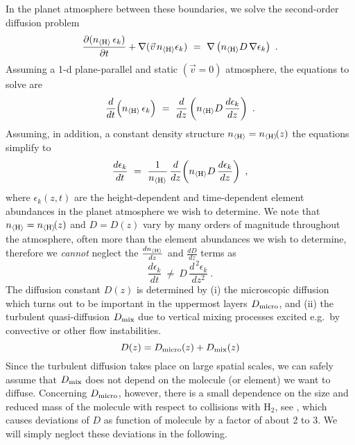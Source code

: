 \documentclass[11pt]{article}
\def\nH{n_{\langle\rm H\rangle}}
\def\ek{\epsilon_k}
\def\pdiff#1#2{\frac{\partial #1}{\partial #2}}
\begin{document}
In the planet atmosphere between these boundaries, we solve the 
second-order diffusion problem
\begin{equation}
  \pdiff{(\nH\,\ek)}{t} + \nabla(\vec{v}\,\nH\ek) 
   ~=~ \nabla\left(\nH D\,\nabla\ek\right) \ .
\end{equation}
Assuming a 1-d plane-parallel and static $(\vec{v}=0)$ atmosphere, the
equations to solve are
\begin{equation}
  \frac{d}{dt}\Big(\nH\,\ek\Big) 
  ~=~ \frac{d}{dz}\left(\nH D\,\frac{d\ek}{dz}\right) \ .
  \label{eq:diff1}
\end{equation}
Assuming, in addition, a constant density structure
$\nH=\nH\!(z)$ the equations simplify to
\begin{equation}
  \frac{d\ek}{dt} 
  ~=~ \frac{1}{\nH}\,\frac{d}{dz}\!\left(\nH D\,\frac{d\ek}{dz}\right) \ ,
  \label{eq:diff2}
\end{equation}
where $\ek(z,t)$ are the height-dependent and time-dependent element
abundances in the planet atmosphere we wish to determine. We note that
$\nH=\nH\!(z)$ and $D=D(z)$ vary by many orders of magnitude
throughout the atmosphere, often more than the element abundances we
wish to determine, therefore we {\sl cannot} neglect the
$\frac{d\nH}{dz}$ and $\frac{dD}{dz}$ terms as
\begin{equation}
  \frac{d\ek}{dt} ~\neq~ D\,\frac{d^{\,2}\ek}{dz^2} \ .
\end{equation}
The diffusion constant $D(z)$ is determined by (i) the microscopic diffusion
which turns out to be important in the uppermost layers $D_{\rm
  micro}$, and (ii) the turbulent quasi-diffusion $D_{\rm mix}$ due to 
vertical mixing processes excited e.g.\ by convective or other flow 
instabilities. 
\begin{equation}
  D(z) = D_{\rm micro}(z) + D_{\rm mix}(z)
\end{equation}
Since the turbulent diffusion takes place on large spatial scales, we
can safely assume that $D_{\rm mix}$ does not depend on the molecule
(or element) we want to diffuse. Concerning $D_{\rm micro}$, however, 
there is a small dependence on the size and reduced mass of the
molecule with respect to collisions with H$_2$, see
\citet[][Eq.~(26) therein]{Woitke2003}, which causes deviations
of $D$ as function of molecule by a factor of about 2 to 3. We will simply
neglect these deviations in the following.
\end{document}
